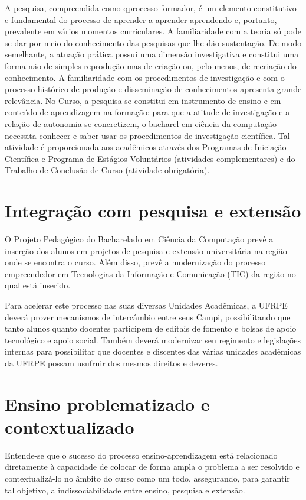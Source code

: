 \documentclass[
	12pt,				%
	openright,			%
  oneside,     %
	a4paper,			%
	english,			%
	french,				%
	spanish,			%
	brazil				%
	]{abntex2}
\begin{document}
A pesquisa, compreendida como qprocesso formador, é um elemento constitutivo e
fundamental do processo de aprender a aprender aprendendo e, portanto,
prevalente em vários momentos curriculares. A familiaridade com a teoria só pode
se dar por meio do conhecimento das pesquisas que lhe dão sustentação. De modo
semelhante, a atuação prática possui uma dimensão investigativa e constitui uma
forma não de simples reprodução mas de criação ou, pelo menos, de recriação do
conhecimento. A familiaridade com os procedimentos de investigação e com o
processo histórico de produção e disseminação de conhecimentos apresenta grande
relevância. No Curso, a pesquisa se constitui em instrumento de ensino e em
conteúdo de aprendizagem na formação: para que a atitude de investigação e a
relação de autonomia se concretizem, o bacharel em ciência da computação
necessita conhecer e saber usar os procedimentos de investigação científica. Tal
atividade é proporcionada aos acadêmicos através dos Programas de Iniciação
Científica e Programa de Estágios Voluntários (atividades complementares) e do
Trabalho de Conclusão de Curso (atividade obrigatória).

\section{Integração com pesquisa e extensão}

O Projeto Pedagógico do Bacharelado em  Ciência da Computação prevê a inserção
dos alunos em projetos de pesquisa e extensão  universitária na região onde se
encontra o curso. Além disso, prevê a modernização  do processo empreendedor em
Tecnologias da Informação e Comunicação (TIC) da  região no qual está inserido.

Para acelerar este processo nas suas diversas Unidades  Acadêmicas, a UFRPE
deverá prover mecanismos de intercâmbio entre seus Campi, possibilitando que
tanto alunos quanto docentes participem de editais de  fomento e bolsas de apoio
tecnológico e apoio social. Também deverá modernizar  seu regimento e
legislações internas para possibilitar que docentes e  discentes das várias
unidades acadêmicas da UFRPE possam usufruir dos mesmos direitos e deveres.

\section{Ensino problematizado e contextualizado}

Entende-se que o sucesso do processo ensino-aprendizagem está
relacionado diretamente à capacidade de colocar de forma ampla o problema a ser
resolvido e contextualizá-lo no âmbito do curso como um todo, assegurando, para
garantir tal objetivo, a indissociabilidade entre ensino, pesquisa e extensão. 
\end{document}
